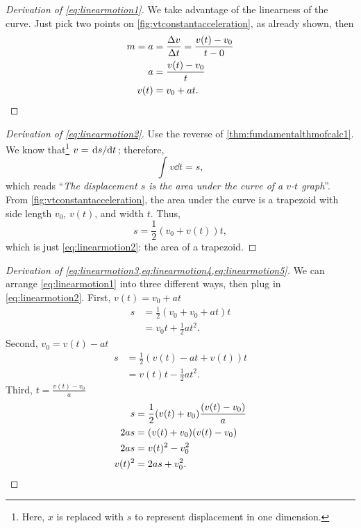 \begin{multicols}{2}
\begin{proof}[Derivation of \cref{eq:linearmotion1}]
    We take advantage of the linearness of the curve. Just pick two points on \cref{fig:vtconstantacceleration}, as already shown, then
    \begin{align*}
        m = a &= \frac{\Delta v}{\Delta t} = \frac{v(t) - v_0}{t - 0} \\
        a & = \frac{v(t) - v_0}{t} \\
        v(t) &= v_0 + at.\qedhere
    \end{align*}
\end{proof}

\begin{proof}[Derivation of \cref{eq:linearmotion2}] 
    Use the reverse of \cref{thm:fundamentalthmofcalc1}. We know that\footnote{Here, $x$ is replaced with $s$ to represent displacement in one dimension.} $v = \dv*{s}{t}$; therefore,
    \begin{equation*}
        \int v\dd{t} = s,
    \end{equation*}
    which reads ``\emph{The displacement $s$ is the area under the curve of a $v$-$t$ graph}''. From \cref{fig:vtconstantacceleration}, the area under the curve is a trapezoid with side length $v_0$, $v(t)$, and width $t$. Thus,
    \begin{equation*}
        s = \frac{1}{2}(v_0 + v(t))t,
    \end{equation*}
    which is just \cref{eq:linearmotion2}: the area of a trapezoid.
\end{proof}

\begin{proof}[Derivation of \cref{eq:linearmotion3,eq:linearmotion4,eq:linearmotion5}]
    We can arrange \cref{eq:linearmotion1} into three different ways, then plug in \cref{eq:linearmotion2}.
    First, $v(t) = v_0 + at$
    \begin{align*}
        s &= \frac{1}{2}(v_0 + v_0 + at)t \\
        &= v_0t + \frac{1}{2}at^2. 
    \end{align*}
    Second, $v_0 = v(t) - at$
    \begin{align*}
        s &= \frac{1}{2}(v(t) - at + v(t))t \\
        &= v(t)t - \frac{1}{2}at^2. 
    \end{align*}
    Third, $\displaystyle{t = \frac{v(t) - v_0}{a}}$
    \begin{align*}
        s &= \frac{1}{2}(v(t) + v_0)\frac{(v(t) - v_0)}{a} \\
        2as &= (v(t) + v_0)(v(t) - v_0) \\
        2as &= v(t)^2 - v_0^2 \\
        v(t)^2 &= 2as + v_0^2. \qedhere
    \end{align*}
\end{proof}
\end{multicols}

